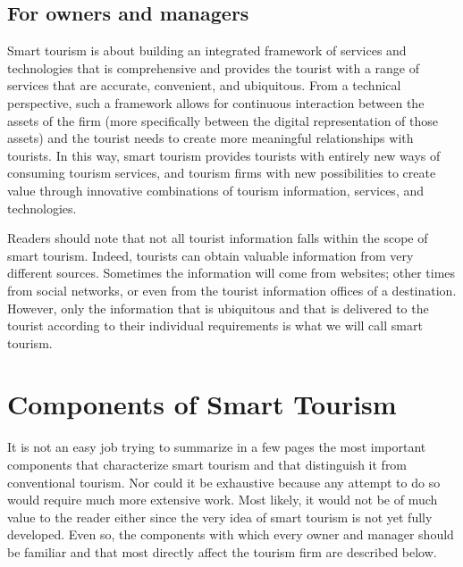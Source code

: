 \documentclass[
  letterpaper,
  DIV=11,
  numbers=noendperiod]{scrreprt}
\begin{document}
\hypertarget{for-owners-and-managers-1}{%
\subsection{For owners and managers}\label{for-owners-and-managers-1}}

Smart tourism is about building an integrated framework of services and
technologies that is comprehensive and provides the tourist with a range
of services that are accurate, convenient, and ubiquitous. From a
technical perspective, such a framework allows for continuous
interaction between the assets of the firm (more specifically between
the digital representation of those assets) and the tourist needs to
create more meaningful relationships with tourists. In this way, smart
tourism provides tourists with entirely new ways of consuming tourism
services, and tourism firms with new possibilities to create value
through innovative combinations of tourism information, services, and
technologies.

Readers should note that not all tourist information falls within the
scope of smart tourism. Indeed, tourists can obtain valuable information
from very different sources. Sometimes the information will come from
websites; other times from social networks, or even from the tourist
information offices of a destination. However, only the information that
is ubiquitous and that is delivered to the tourist according to their
individual requirements is what we will call smart tourism.

\hypertarget{components-of-smart-tourism}{%
\section{Components of Smart
Tourism}\label{components-of-smart-tourism}}

It is not an easy job trying to summarize in a few pages the most
important components that characterize smart tourism and that
distinguish it from conventional tourism. Nor could it be exhaustive
because any attempt to do so would require much more extensive work.
Most likely, it would not be of much value to the reader either since
the very idea of smart tourism is not yet fully developed. Even so, the
components with which every owner and manager should be familiar and
that most directly affect the tourism firm are described below.
\end{document}
